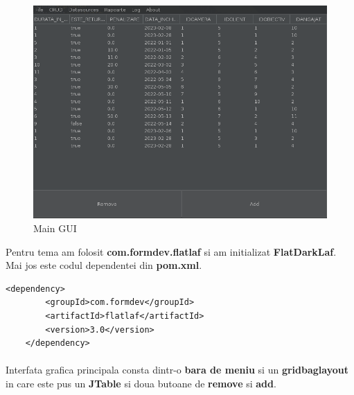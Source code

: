 \documentclass[oneside]{article}
\begin{document}
\paragraph{}
\begin{figure}[ht]
    \centering
    \noindent\includegraphics[scale=0.4]{program.png}
    \caption{Main GUI}
    \label{fig:maingui}
\end{figure}

Pentru tema am folosit \textbf{com.formdev.flatlaf} si am initializat \textbf{FlatDarkLaf}. Mai jos este codul dependentei din \textbf{pom.xml}.
\begin{center}
    \begin{lstlisting}[language=pom]
    <dependency>
        <groupId>com.formdev</groupId>
        <artifactId>flatlaf</artifactId>
        <version>3.0</version>
    </dependency>
    \end{lstlisting}
\end{center}

\paragraph{} Interfata grafica principala consta dintr-o \textbf{bara de meniu} si un \textbf{gridbaglayout} in care este pus un \textbf{JTable} si doua butoane de \textbf{remove} si \textbf{add}.
\end{document}
